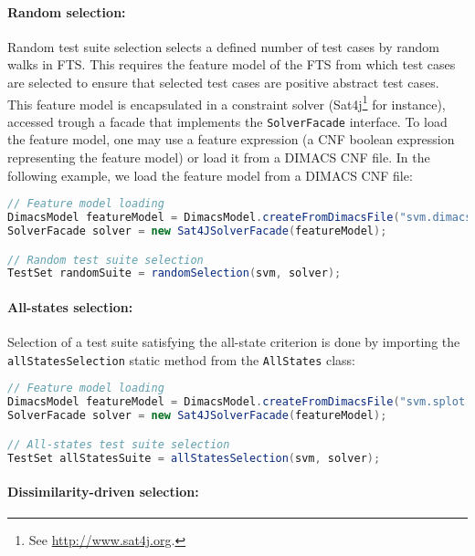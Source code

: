 \paragraph{Random selection:}

Random test suite selection selects a defined number of test cases by random walks in \gls{FTS}. This requires the \gls{feature model} of the \gls{FTS} from which test cases are selected to ensure that selected test cases are positive abstract test cases. This feature model is encapsulated in a constraint solver (Sat4j\footnote{See \url{http://www.sat4j.org}.} for instance), accessed trough a facade that implements the \texttt{SolverFacade} interface. To load the feature model, one may use a feature expression (a \gls{CNF} boolean expression representing the feature model) or load it from a DIMACS CNF file. In the following example, we load the feature model from a DIMACS CNF file:
%
\begin{lstlisting}[language=Java,frame=single,numbers=none]
// Feature model loading
DimacsModel featureModel = DimacsModel.createFromDimacsFile("svm.dimacs");
SolverFacade solver = new Sat4JSolverFacade(featureModel);  

// Random test suite selection
TestSet randomSuite = randomSelection(svm, solver);
\end{lstlisting}
%


\paragraph{All-states selection:}

Selection of a test suite satisfying the all-state criterion is done by importing the \texttt{allStatesSelection} static method from the \texttt{AllStates} class:
%
\begin{lstlisting}[language=Java,frame=single,numbers=none]
// Feature model loading
DimacsModel featureModel = DimacsModel.createFromDimacsFile("svm.splot.dimacs");
SolverFacade solver = new Sat4JSolverFacade(featureModel);  

// All-states test suite selection
TestSet allStatesSuite = allStatesSelection(svm, solver);
\end{lstlisting}
%

\paragraph{Dissimilarity-driven selection:}

